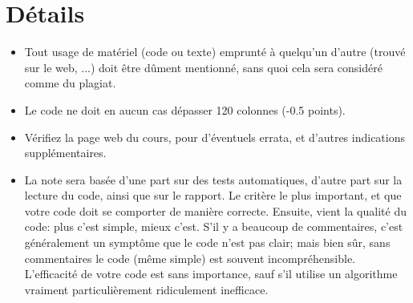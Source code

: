 \documentclass{article}
\begin{document}
\section{Détails}

\begin{itemize}
\item Tout usage de matériel (code ou texte) emprunté à quelqu'un d'autre
  (trouvé sur le web, ...) doit être dûment mentionné, sans quoi cela sera
  considéré comme du plagiat.
\item Le code ne doit en aucun cas dépasser 120 colonnes (-0.5 points).
\item Vérifiez la page web du cours, pour d'éventuels errata, et d'autres
  indications supplémentaires.
\item La note sera basée d'une part sur des tests automatiques, d'autre part
  sur la lecture du code, ainsi que sur le rapport.  Le critère le plus
  important, et que votre code doit se comporter de manière correcte.
  Ensuite, vient la qualité du code: plus c'est simple, mieux c'est.
  S'il y a beaucoup de commentaires, c'est généralement un symptôme que le
  code n'est pas clair; mais bien sûr, sans commentaires le code (même
  simple) est souvent incompréhensible.  L'efficacité de votre code est sans
  importance, sauf s'il utilise un algorithme vraiment particulièrement
  ridiculement inefficace.
\end{itemize}
\end{document}
